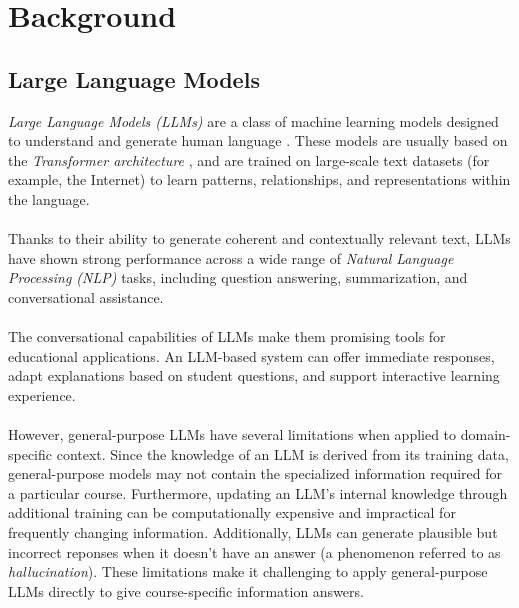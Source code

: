 \documentclass[12pt, a4paper]{report}
\begin{document}
\chapter{Background}
\section{Large Language Models}
\textit{Large Language Models (LLMs)} are a class of machine learning models designed to understand and generate human language \cite{ibm2026_1}. These models are usually based on the \textit{Transformer architecture} \cite{vaswani2017}, and are trained on large-scale text datasets (for example, the Internet) to learn patterns, relationships, and representations within the language.~\\~\\
Thanks to their ability to generate coherent and contextually relevant text, LLMs have shown strong performance across a wide range of \textit{Natural Language Processing (NLP)} tasks, including question answering, summarization, and conversational assistance.~\\~\\
The conversational capabilities of LLMs make them promising tools for educational applications. An LLM-based system can offer immediate responses, adapt explanations based on student questions, and support interactive learning experience. ~\\~\\
However, general-purpose LLMs have several limitations when applied to domain-specific context. Since the knowledge of an LLM is derived from its training data, general-purpose models may not contain the specialized information required for a particular course. Furthermore, updating an LLM's internal knowledge through additional training can be computationally expensive and impractical for frequently changing information. Additionally, LLMs can generate plausible but incorrect reponses when it doesn't have an answer (a phenomenon referred to as \textit{hallucination}). These limitations make it challenging to apply general-purpose LLMs directly to give course-specific information answers.
\end{document}

